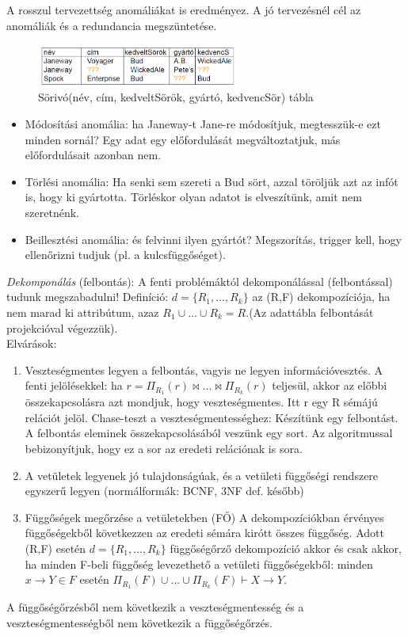 \documentclass[margin=0px]{article}
\begin{document}
	A rosszul tervezettség anomáliákat is eredményez. A jó tervezésnél cél az anomáliák és a redundancia megszüntetése.
	\begin{figure}[H]
		\centering
		\includegraphics[width=0.6\textwidth]{img/dekomp1.png}
		\caption{Sörivó(név, cím, kedveltSörök, gyártó, kedvencSör) tábla}
	\end{figure}
	\begin{itemize}
		\item Módosítási anomália: ha Janeway-t Jane-re módosítjuk, megtesszük-e ezt minden sornál? Egy adat egy előfordulását megváltoztatjuk, más előfordulásait azonban nem.
		\item Törlési anomália: Ha senki sem szereti a Bud sört, azzal töröljük azt az infót is, hogy ki gyártotta. Törléskor olyan adatot is elveszítünk, amit nem szeretnénk.
		\item Beillesztési anomália: és felvinni ilyen gyártót? Megszorítás, trigger kell, hogy ellenőrizni tudjuk (pl. a kulcsfüggőséget).
	\end{itemize}
	\textit{Dekomponálás} (felbontás): A fenti problémáktól dekomponálással (felbontással) tudunk megszabadulni! Definíció: $d=\{R_1,...,R_k\}$ az (R,F) dekompozíciója, ha nem marad ki attribútum, azaz $R_1\cup ...\cup R_k=R$.(Az adattábla felbontását projekcióval végezzük). \\
	Elvárások:
	\begin{enumerate}
		\item Veszteségmentes legyen a felbontás, vagyis ne legyen információvesztés. A fenti jelölésekkel: ha $r = \Pi_{R_1}(r) \bowtie ... \bowtie \Pi_{R_k}(r)$ teljesül, akkor az előbbi összekapcsolásra azt mondjuk, hogy veszteségmentes. Itt r egy R sémájú relációt jelöl. Chase-teszt a veszteségmentességhez: Készítünk egy felbontást. A felbontás eleminek összekapcsolásából veszünk egy sort. Az algoritmussal bebizonyítjuk, hogy ez a sor az eredeti relációnak is sora.
		\item A vetületek legyenek jó tulajdonságúak, és a vetületi függőségi rendszere egyszerű legyen (normálformák: BCNF, 3NF def. később)
		\item Függőségek megőrzése a vetületekben (FŐ) A dekompozíciókban érvényes függőségekből következzen az eredeti sémára kirótt összes függőség. Adott (R,F) esetén $d=\{R_1,...,R_k\}$ függőségőrző dekompozíció akkor és csak akkor, ha minden F-beli függőség levezethető a vetületi függőségekből: minden $x \to Y \in F$ esetén $\Pi_{R_1}(F) \cup ... \cup \Pi_{R_k}(F) \vdash X \to Y$.
	\end{enumerate}
	A függőségőrzésből nem következik a veszteségmentesség és a veszteségmentességből nem következik a
	függőségőrzés. \\
	
\end{document}
